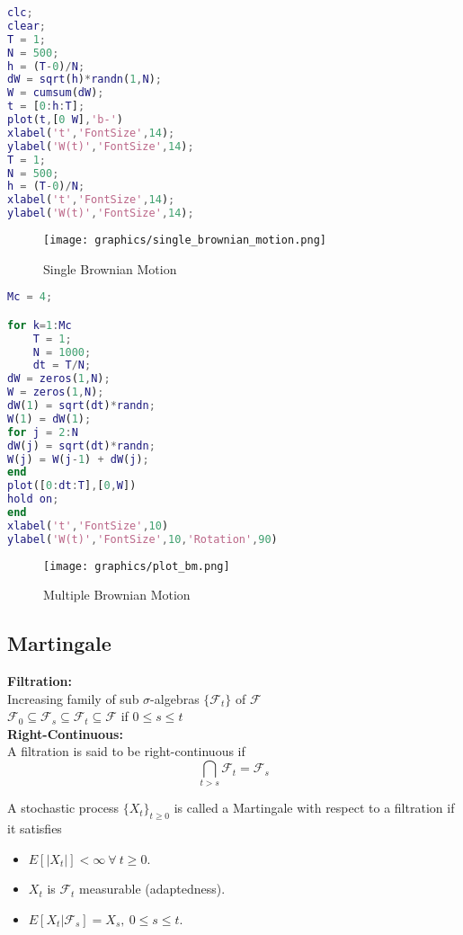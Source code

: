 \documentclass[twoside,final]{hcmut-report}
\begin{document}
\begin{lstlisting}[language=Matlab, caption={My MATLAB Code}, label={lst:matlabcode}]
clc;
clear;
T = 1;
N = 500;
h = (T-0)/N;
dW = sqrt(h)*randn(1,N);
W = cumsum(dW);
t = [0:h:T];
plot(t,[0 W],'b-')
xlabel('t','FontSize',14);
ylabel('W(t)','FontSize',14);
T = 1;
N = 500;
h = (T-0)/N;
xlabel('t','FontSize',14);
ylabel('W(t)','FontSize',14);

\end{lstlisting}
\newpage
 \begin{figure}[h]
      \centering
                    \texttt{[image: graphics/single\_brownian\_motion.png]}
                    \caption{Single Brownian Motion}
    \end{figure}
\newpage
\begin{lstlisting}[language=Matlab, caption={My MATLAB Code}, label={lst:matlabcode}]
Mc = 4;

for k=1:Mc
    T = 1;
    N = 1000;
    dt = T/N;
dW = zeros(1,N);
W = zeros(1,N); 
dW(1) = sqrt(dt)*randn;
W(1) = dW(1);
for j = 2:N
dW(j) = sqrt(dt)*randn; 
W(j) = W(j-1) + dW(j);
end
plot([0:dt:T],[0,W])
hold on;
end
xlabel('t','FontSize',10)
ylabel('W(t)','FontSize',10,'Rotation',90)

\end{lstlisting}
\newpage

 \begin{figure}[h]
      \centering
                    \texttt{[image: graphics/plot\_bm.png]}
                    \caption{Multiple Brownian Motion}
    \end{figure}

\pagebreak

\subsection{Martingale}

    \textbf{Filtration:}\\
    Increasing family of sub $\sigma$-algebras $\{\mathcal{F}_t\}$ of $\mathcal{F}$\\
    $\mathcal{F}_0  \subseteq \mathcal{F}_s  \subseteq \mathcal{F}_t  \subseteq \mathcal{F}$ if $0 \leq s \leq t$\\
    \textbf{Right-Continuous:} \\ 
    A filtration is said to be right-continuous if 
    \[ \bigcap_{t > s} \mathcal{F}_t = \mathcal{F}_s\]

    A stochastic process $\{X_t\}_{t \geq 0}$ is called a Martingale with respect to a filtration if it satisfies
    \begin{itemize}
        \item ${E}[\left| X_t \right|] < \infty \ \forall \ t \geq 0$.
        \item $X_t$ is $\mathcal{F}_t$ measurable (adaptedness).
        \item ${E}[X_t|\mathcal{F}_s] = X_s, \ 0 \leq s \leq t$.
    \end{itemize}
\end{document}

